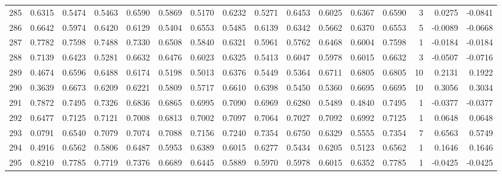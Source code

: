 \begin{tabular}{lrrrrrrrrrrrrrrr}
285 &      0.6315 &  0.5474 &  0.5463 &  0.6590 &  0.5869 &  0.5170 &  0.6232 &  0.5271 &  0.6453 &  0.6025 &   0.6367 &     0.6590 &      3 &                    0.0275 &                    -0.0841 \\
286 &      0.6642 &  0.5974 &  0.6420 &  0.6129 &  0.5404 &  0.6553 &  0.5485 &  0.6139 &  0.6342 &  0.5662 &   0.6370 &     0.6553 &      5 &                   -0.0089 &                    -0.0668 \\
287 &      0.7782 &  0.7598 &  0.7488 &  0.7330 &  0.6508 &  0.5840 &  0.6321 &  0.5961 &  0.5762 &  0.6468 &   0.6004 &     0.7598 &      1 &                   -0.0184 &                    -0.0184 \\
288 &      0.7139 &  0.6423 &  0.5281 &  0.6632 &  0.6476 &  0.6023 &  0.6325 &  0.5413 &  0.6047 &  0.5978 &   0.6015 &     0.6632 &      3 &                   -0.0507 &                    -0.0716 \\
289 &      0.4674 &  0.6596 &  0.6488 &  0.6174 &  0.5198 &  0.5013 &  0.6376 &  0.5449 &  0.5364 &  0.6711 &   0.6805 &     0.6805 &     10 &                    0.2131 &                     0.1922 \\
290 &      0.3639 &  0.6673 &  0.6209 &  0.6221 &  0.5809 &  0.5717 &  0.6610 &  0.6398 &  0.5450 &  0.5360 &   0.6695 &     0.6695 &     10 &                    0.3056 &                     0.3034 \\
291 &      0.7872 &  0.7495 &  0.7326 &  0.6836 &  0.6865 &  0.6995 &  0.7090 &  0.6969 &  0.6280 &  0.5489 &   0.4840 &     0.7495 &      1 &                   -0.0377 &                    -0.0377 \\
292 &      0.6477 &  0.7125 &  0.7121 &  0.7008 &  0.6813 &  0.7002 &  0.7097 &  0.7064 &  0.7027 &  0.7092 &   0.6992 &     0.7125 &      1 &                    0.0648 &                     0.0648 \\
293 &      0.0791 &  0.6540 &  0.7079 &  0.7074 &  0.7088 &  0.7156 &  0.7240 &  0.7354 &  0.6750 &  0.6329 &   0.5555 &     0.7354 &      7 &                    0.6563 &                     0.5749 \\
294 &      0.4916 &  0.6562 &  0.5806 &  0.6487 &  0.5953 &  0.6389 &  0.6015 &  0.6277 &  0.5434 &  0.6205 &   0.5123 &     0.6562 &      1 &                    0.1646 &                     0.1646 \\
295 &      0.8210 &  0.7785 &  0.7719 &  0.7376 &  0.6689 &  0.6445 &  0.5889 &  0.5970 &  0.5978 &  0.6015 &   0.6352 &     0.7785 &      1 &                   -0.0425 &                    -0.0425 \\

\end{tabular}
